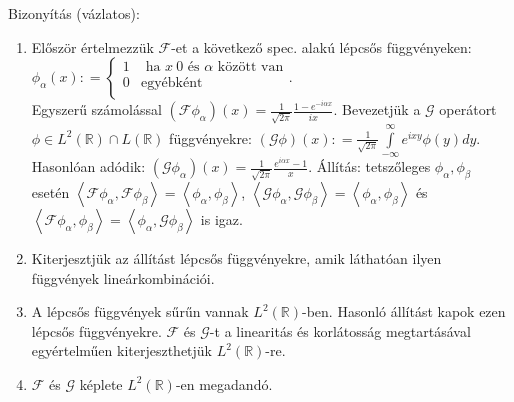 \documentclass[12pt,a4paper]{scrartcl}
\providecommand{\tightlist}{%
  \setlength{\itemsep}{0pt}\setlength{\parskip}{0pt}}
\newenvironment{bizonyitas}{}{}
\begin{document}
\begin{bizonyitas}

Bizonyítás (vázlatos):

\begin{enumerate}
\def\labelenumi{\arabic{enumi}.}
\tightlist
\item
  Először értelmezzük \(\mathcal{F}\)-et a következő spec. alakú lépcsős
  függvényeken:
  \(\phi_{\alpha}\left( x \right): = \begin{cases} 1 & {\text{~ha~}x\ 0\text{~és~}\alpha\text{~között~van}} \\ 0 & \text{egyébként} \\ \end{cases}\).\\
  Egyszerű számolással
  \(\left( {\mathcal{F}\phi_{\alpha}} \right)\left( x \right) = \frac{1}{\sqrt{2\pi}}\frac{1 - e^{- i\alpha x}}{ix}\).
  Bevezetjük a \(\mathcal{G}\) operátort
  \(\phi \in L^{2}\left( {\mathbb{R}} \right) \cap L\left( {\mathbb{R}} \right)\)
  függvényekre:
  \(\left( {\mathcal{G}\phi} \right)\left( x \right): = \frac{1}{\sqrt{2\pi}}{\int\limits_{- \infty}^{\infty}{e^{ixy}\phi\left( y \right)dy}}\).
  Hasonlóan adódik:
  \(\left( {\mathcal{G}\phi_{\alpha}} \right)\left( x \right) = \frac{1}{\sqrt{2\pi}}\frac{e^{i\alpha x} - 1}{x}\).
  Állítás: tetszőleges \(\phi_{\alpha},\phi_{\beta}\) esetén
  \(\left\langle {\mathcal{F}\phi_{\alpha},\mathcal{F}\phi_{\beta}} \right\rangle = \left\langle {\phi_{\alpha},\phi_{\beta}} \right\rangle\),
  \(\left\langle {\mathcal{G}\phi_{\alpha},\mathcal{G}\phi_{\beta}} \right\rangle = \left\langle {\phi_{\alpha},\phi_{\beta}} \right\rangle\)
  és
  \(\left\langle {\mathcal{F}\phi_{\alpha},\phi_{\beta}} \right\rangle = \left\langle {\phi_{\alpha},\mathcal{G}\phi_{\beta}} \right\rangle\)
  is igaz.
\item
  Kiterjesztjük az állítást lépcsős függvényekre, amik láthatóan ilyen
  függvények lineárkombinációi.
\item
  A lépcsős függvények sűrűn vannak
  \(L^{2}\left( {\mathbb{R}} \right)\)-ben. Hasonló állítást kapok ezen
  lépcsős függvényekre. \(\mathcal{F}\) és \(\mathcal{G}\)-t a
  linearitás és korlátosság megtartásával egyértelműen kiterjeszthetjük
  \(L^{2}\left( {\mathbb{R}} \right)\)-re.
\item
  \(\mathcal{F}\) és \(\mathcal{G}\) képlete
  \(L^{2}\left( {\mathbb{R}} \right)\)-en megadandó.
\end{enumerate}

\end{bizonyitas}
\end{document}
